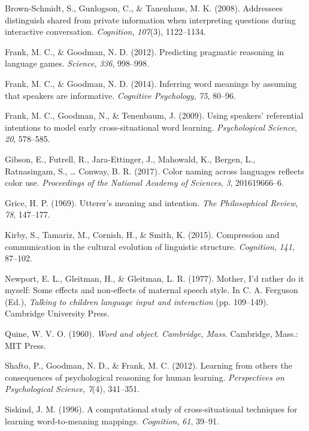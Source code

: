 \documentclass[english,floatsintext,man]{apa6}
\theoremstyle{definition}
\theoremstyle{definition}
\theoremstyle{definition}
\theoremstyle{remark}
\begin{document}
\hypertarget{ref-brown-schmidt2008}{}
Brown-Schmidt, S., Gunlogson, C., \& Tanenhaus, M. K. (2008). Addressees
distinguish shared from private information when interpreting questions
during interactive conversation. \emph{Cognition}, \emph{107}(3),
1122--1134.

\hypertarget{ref-frank2012}{}
Frank, M. C., \& Goodman, N. D. (2012). Predicting pragmatic reasoning
in language games. \emph{Science}, \emph{336}, 998--998.

\hypertarget{ref-frank2014}{}
Frank, M. C., \& Goodman, N. D. (2014). Inferring word meanings by
assuming that speakers are informative. \emph{Cognitive Psychology},
\emph{75}, 80--96.

\hypertarget{ref-frank2009}{}
Frank, M. C., Goodman, N., \& Tenenbaum, J. (2009). Using speakers'
referential intentions to model early cross-situational word learning.
\emph{Psychological Science}, \emph{20}, 578--585.

\hypertarget{ref-gibson2017}{}
Gibson, E., Futrell, R., Jara-Ettinger, J., Mahowald, K., Bergen, L.,
Ratnasingam, S., \ldots{} Conway, B. R. (2017). Color naming across
languages reflects color use. \emph{Proceedings of the National Academy
of Sciences}, \emph{3}, 201619666--6.

\hypertarget{ref-grice1969}{}
Grice, H. P. (1969). Utterer's meaning and intention. \emph{The
Philosophical Review}, \emph{78}, 147--177.

\hypertarget{ref-kirby2015}{}
Kirby, S., Tamariz, M., Cornish, H., \& Smith, K. (2015). Compression
and communication in the cultural evolution of linguistic structure.
\emph{Cognition}, \emph{141}, 87--102.

\hypertarget{ref-newport1977}{}
Newport, E. L., Gleitman, H., \& Gleitman, L. R. (1977). Mother, I'd
rather do it myself: Some effects and non-effects of maternal speech
style. In C. A. Ferguson (Ed.), \emph{Talking to children language input
and interaction} (pp. 109--149). Cambridge University Press.

\hypertarget{ref-quine1960}{}
Quine, W. V. O. (1960). \emph{Word and object}. \emph{Cambridge, Mass}.
Cambridge, Mass.: MIT Press.

\hypertarget{ref-shafto2012}{}
Shafto, P., Goodman, N. D., \& Frank, M. C. (2012). Learning from others
the consequences of psychological reasoning for human learning.
\emph{Perspectives on Psychological Science}, \emph{7}(4), 341--351.

\hypertarget{ref-siskind1996}{}
Siskind, J. M. (1996). A computational study of cross-situational
techniques for learning word-to-meaning mappings. \emph{Cognition},
\emph{61}, 39--91.
\end{document}
